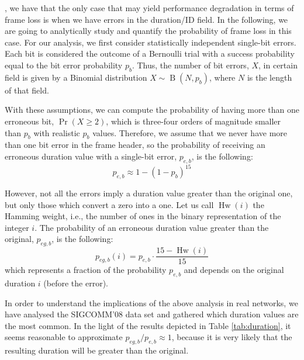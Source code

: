 \documentclass[twoside,nohyper]{tufte-book}
\begin{document}
, we have that the only case that may yield performance degradation in terms of frame loss is when we have errors in the duration/ID field. In the following, we are going to analytically study and quantify the probability of frame loss in this case. For our analysis, we first consider statistically independent single-bit errors. Each bit is considered the outcome of a Bernoulli trial with a success probability equal to the bit error probability \(p_{b}\). Thus, the number of bit errors, \(X\), in certain field is given by a Binomial distribution \(X\sim \operatorname{B}(N, p_b)\), where \(N\) is the length of that field.

With these assumptions, we can compute the probability of having more than one erroneous bit, \(\Pr(X \geq 2)\), which is three-four orders of magnitude smaller than \(p_b\) with realistic \(p_b\) values. Therefore, we assume that we never have more than one bit error in the frame header, so the probability of receiving an erroneous duration value with a single-bit error, \(p_{e,b}\), is the following:
%
\begin{equation}
 p_{e,b} \approx 1 - (1 - p_b)^{15} \label{eq:peb}
\end{equation}
%


However, not all the errors imply a duration value greater than the original one, but only those which convert a zero into a one. Let us call \(\operatorname{Hw}(i)\) the Hamming weight, i.e., the number of ones in the binary representation of the integer \(i\). The probability of an erroneous duration value greater than the original, \(p_{eg,b}\), is the following:
%
\begin{equation}
 p_{eg,b}(i) = p_{e,b}\cdot \frac{15 -\operatorname{Hw}(i)}{15}
 \label{eq:pegb}
\end{equation}
%
which represents a fraction of the probability \(p_{e,b}\) and depends on the original duration \(i\) (before the error).

In order to understand the implications of the above analysis in real networks, we have analysed the SIGCOMM'08 data set\cite[0pt]{umd-sigcomm2008-2009-03-02} and gathered which duration values are the most common. In the light of the results depicted in Table \ref{tab:duration}, it seems reasonable to approximate \(p_{eg,b}/p_{e,b} \approx 1\), because it is very likely that the resulting duration will be greater than the original.
\end{document}
